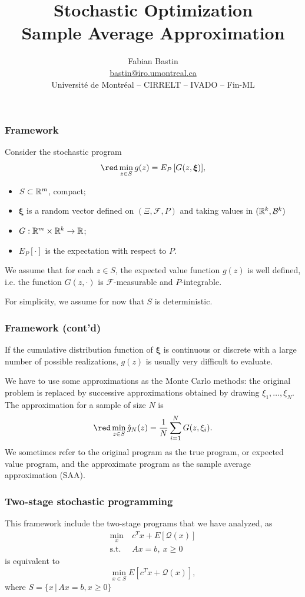 \documentclass{beamer}
\title[SAA]{Stochastic Optimization\\Sample Average Approximation}
\author[Fabian Bastin]{Fabian Bastin \\ \url{bastin@iro.umontreal.ca} \\ Université de Montréal -- CIRRELT -- IVADO -- Fin-ML}
\date{}
\def\bxi{\boldsymbol\xi}
\def\cQ{\mathcal{Q}}
\begin{document}
\frame{\titlepage}

\begin{frame}
\frametitle{Framework}

Consider the stochastic program
\[
{\red \min_{z \in S} g(z) = E_P \left[ G(z, \bxi) \right]},
\]
\vspace{-0.5cm}
\begin{itemize}
\item 
$S \subset \mathbb{R}^m$, compact;
\item
$\bxi$ is a random vector defined on $( \Xi, \mathcal{F}, P )$ and taking values in $( \mathbb{R}^k, \mathcal{B}^k )$ %
\item
$G: \mathbb{R}^m \times \mathbb{R}^k \rightarrow \mathbb{R}$;
\item
$E_P[\cdot]$ is the expectation with respect to $P$.
\end{itemize}

We assume that for each $z \in S$, the expected value function $g(z)$ is well defined, i.e. the function $G(z,\cdot)$ is $\mathcal{F}$-measurable and $P$-integrable.

\mbox{}

For simplicity, we assume for now that {\blue $S$ is deterministic}.

\end{frame}

\begin{frame}
\frametitle{Framework (cont'd)}

If the cumulative distribution function of $\bxi$ is continuous or discrete with a large number of possible realizations, $g(z)$ is usually very difficult to evaluate.

\mbox{}

We have to use some approximations as the Monte Carlo methods: the original problem is replaced by successive approximations obtained by drawing $\xi_1,\ldots{}, \xi_N$.
The approximation for a sample of size $N$ is
\[
{\red \min_{z \in S} \hat{g}_N(z) = \frac{1}{N} \sum_{i = 1}^N
  G(z, \xi_i)}.
\]
We sometimes refer to the original program as the {\blue true program}, or {\blue expected value program}, and the approximate program as the {\blue sample average approximation (SAA)}.

\end{frame}

\begin{frame}
\frametitle{Two-stage stochastic programming}

This framework include the two-stage programs that we have analyzed, as
\begin{align*}
\min_x\ & c^Tx + E[\cQ(x)] \\
\mbox{s.t. } & Ax = b,\ x \geq 0
\end{align*}
is equivalent to
$$
\min_{x \in S} E[c^Tx + \cQ(x)],
$$
where $S = \{ x \,|\, Ax = b, x \geq 0 \}$

\end{frame}
\end{document}

